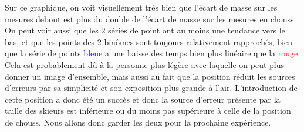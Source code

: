 \documentclass{article}
\begin{document}
\begin{center}
\end{center}

Sur ce graphique, on voit visuellement très bien que l'écart de masse sur les mesures debout est plus du double de l'écart de masse sur les mesures en chouss. 
\newline On peut voir aussi que les $2$ séries de point ont au moins une tendance vers le bas, et que les points des $2$ binômes sont toujours relativement rapprochés, bien que la série de points \textcolor{blue}{bleue} a une baisse des temps bien plus linéaire que la \textcolor{red}{rouge}. Cela est probablement dû à la personne plus légère avec laquelle on peut plus donner un image d'ensemble, mais aussi au fait que la position réduit les sources d'erreurs par sa simplicité et son exposition plus grande à l'air. L'introduction de cette position a donc été un succès et donc la source d'erreur présente par la taille des skieurs est inférieure ou du moins pas supérieure à celle de la position de chouss. Nous allons donc garder les deux pour la prochaine expérience.

\vspace{0.3cm}
\end{document}
